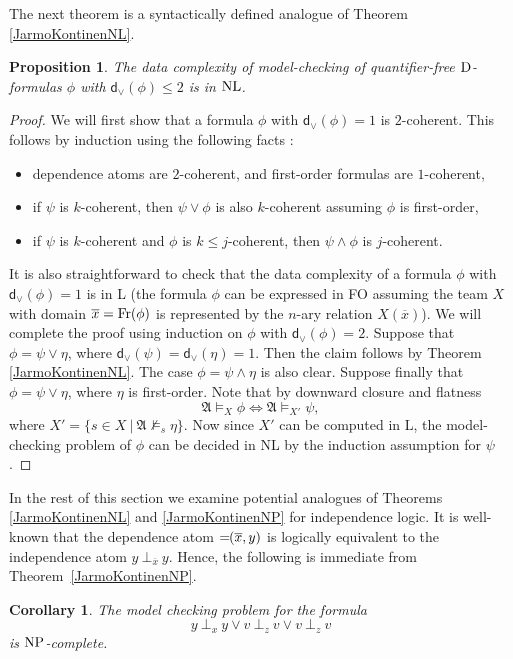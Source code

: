 \documentclass{article}
\theoremstyle{plain}
\newtheorem{corollary}[theorem]{Corollary}
\newtheorem{proposition}[theorem]{Proposition}
\theoremstyle{definition}
\newcommand{\mA}{{\mathfrak A}}
\newcommand{\Fr}{{\rm Fr}}
\newcommand*\dep{{=\mkern-1.2mu}}
\newcommand{\df}{\rm{D}}
\newcommand{\np}{{\rm NP}}
\newcommand{\nl}{{\rm NL}}
\newcommand{\tu}[1]{\overline{#1}}
\newcommand{\indep}[3]{{#1}\ \bot_{#2}\ {#3}}
\newcommand{\Disjunctiondepth}[1]{\textsf{d}_{\vee}(#1)}
\begin{document}
The next theorem  is a syntactically defined analogue of Theorem  \ref{JarmoKontinenNL}.
\begin{proposition}\label{disjunction depth 2}
The data complexity of  model-checking of quantifier-free $\df$-formulas  $\phi$ with $\Disjunctiondepth{\phi} \leq 2$ is in  $\nl$.
\end{proposition}

\begin{proof} We will first show that a formula  $\phi$ with $\Disjunctiondepth{\phi} =1$ is $2$-coherent.
 This follows by induction using the following facts \cite{kontinenj13}: 
 \begin{itemize}
\item dependence atoms are $2$-coherent, and first-order formulas are $1$-coherent,
\item if $\psi$ is $k$-coherent, then $\psi\vee \phi$ is also $k$-coherent assuming  $\phi$ is first-order,
\item  if   $\psi$ is $k$-coherent and  $\phi$ is $k\le j$-coherent, then  $\psi\wedge \phi$ is $j$-coherent.
\end{itemize}
It is also straightforward to check that the data complexity of a formula  $\phi$ with $\Disjunctiondepth{\phi} =1$ is in L (the formula $\phi$ can be  expressed in FO assuming the team $X$ with domain $\tu x=\Fr(\phi)$ is represented by the $n$-ary relation $X(\tu x)$). We will complete the  proof using induction on $\phi$ with  
 $\Disjunctiondepth{\phi} = 2$.  Suppose that  $\phi=\psi\vee \eta$, where  $\Disjunctiondepth{\psi}= \Disjunctiondepth{\eta} = 1$. Then the claim follows by Theorem  \ref{JarmoKontinenNL}. The case $\phi=\psi\wedge \eta$ is also clear. Suppose finally  that $\phi=\psi\vee \eta$, where $\eta$ is first-order. Note that by downward closure and flatness
 $$\mA\models_X \phi \Leftrightarrow  \mA\models_{X'}\psi,$$
where $X'=\{ s\in X \ |\ \mA\not \models_s \eta \}$. Now since $X'$ can be computed in L,  the model-checking problem of $\phi$ can be decided in NL by the induction assumption for $\psi$. \end{proof}


In the rest of this section we examine potential  analogues of Theorems \ref{JarmoKontinenNL} and \ref{JarmoKontinenNP} for  independence logic. It is well-known that the dependence atom $\dep(\tu x,y)$ is logically equivalent to the independence atom $ \indep{y}{\tu x}{y}$. Hence, the following is immediate from Theorem~\ref{JarmoKontinenNP}.


\begin{corollary}\label{3 disjunction relativized independance}
The model checking problem for the formula 
\[\indep{y}{x}{y}\vee \indep{v}{z}{v} \vee \indep{v}{z}{v}\]
 is $\np$-complete.
\end{corollary}
\end{document}
